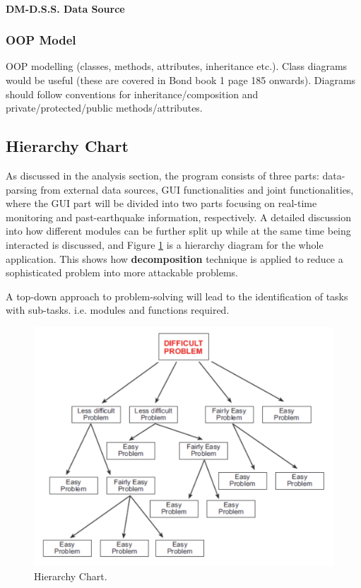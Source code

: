 \documentclass[10pt]{article}
\begin{document}
\paragraph{DM-D.S.S. Data Source}

\subsubsection{OOP Model}
OOP modelling (classes, methods, attributes, inheritance etc.). Class diagrams would be useful (these are covered in Bond book 1 page 185 onwards). Diagrams should follow conventions for inheritance/composition and private/protected/public methods/attributes.

\subsection{Hierarchy Chart}
As discussed in the analysis section, the program consists of three parts: data-parsing from external data sources, GUI functionalities and joint functionalities, where the GUI part will be divided into two parts focusing on real-time monitoring and past-earthquake information, respectively. A detailed discussion into how different modules can be further split up while at the same time being interacted is discussed, and Figure \ref{fig:hierarchy} is a hierarchy diagram for the whole application. This shows how \textbf{decomposition} technique is applied to reduce a sophisticated problem into more attackable problems.

A top-down approach to problem-solving will lead to the identification of tasks with sub-tasks. i.e. modules and functions required.

\begin{figure}[!ht]
    \centering
    \includegraphics[width = 0.5\linewidth]{hierarchy_chart.png}
    \caption{Hierarchy Chart.}
    \label{fig:hierarchy}
\end{figure}
\end{document}
